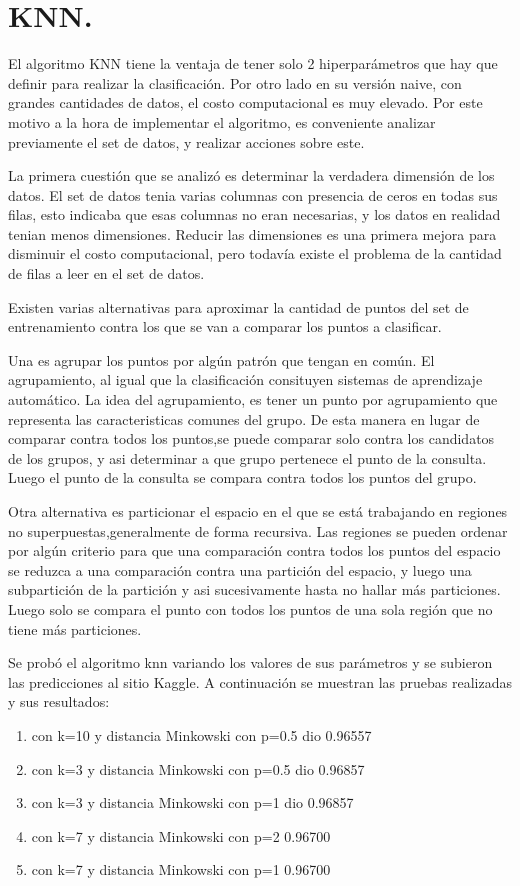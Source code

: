 \chapter{KNN.}
El algoritmo KNN tiene la ventaja de tener solo 2 hiperparámetros que hay que definir para realizar la clasificación. Por otro lado en su versión naive, con grandes cantidades de datos, el costo computacional es muy elevado.
Por este motivo a la hora de implementar el algoritmo, es conveniente analizar previamente el set de datos, y realizar acciones sobre este.

La primera cuestión que se analizó es determinar la verdadera dimensión de los datos. El set de datos tenia varias columnas con presencia de ceros en todas sus filas, esto indicaba que esas columnas no eran necesarias, y los datos en realidad tenian menos dimensiones. Reducir las dimensiones es una primera mejora para disminuir el costo computacional, pero todavía existe el problema de la cantidad de filas a leer en el set de datos. 

Existen varias alternativas para aproximar la cantidad de puntos del set de entrenamiento contra los que se van a comparar los puntos a clasificar.

Una es agrupar los puntos por algún patrón que tengan en común. El agrupamiento, al igual que la clasificación consituyen sistemas de aprendizaje automático. La idea del agrupamiento, es tener un punto por agrupamiento que representa las caracteristicas comunes del grupo. De esta manera en lugar de comparar contra todos los puntos,se puede comparar solo contra los candidatos de los grupos, y asi determinar a que grupo pertenece el punto de la consulta. Luego el punto de la consulta se compara contra todos los puntos del grupo.

Otra alternativa es particionar el espacio en el que se está trabajando en regiones no superpuestas,generalmente de forma recursiva. Las regiones se pueden ordenar por algún criterio para que una comparación contra todos los puntos del espacio se reduzca a una comparación contra una partición del espacio, y luego una subpartición de la partición y asi sucesivamente hasta no hallar más particiones. Luego solo se compara el punto con todos los puntos de una sola región que no tiene más particiones.

Se probó el algoritmo knn variando los valores de sus parámetros y se subieron las predicciones al sitio Kaggle.
A continuación se muestran las pruebas realizadas y sus resultados:
\begin{enumerate}
  \item con k=10 y distancia Minkowski con p=0.5 dio 0.96557
  \item con k=3 y distancia Minkowski con p=0.5 dio 0.96857
  \item con k=3 y distancia Minkowski con p=1 dio 0.96857
  \item con k=7 y distancia Minkowski con p=2 0.96700
  \item con k=7 y distancia Minkowski con p=1 0.96700
\end{enumerate}
